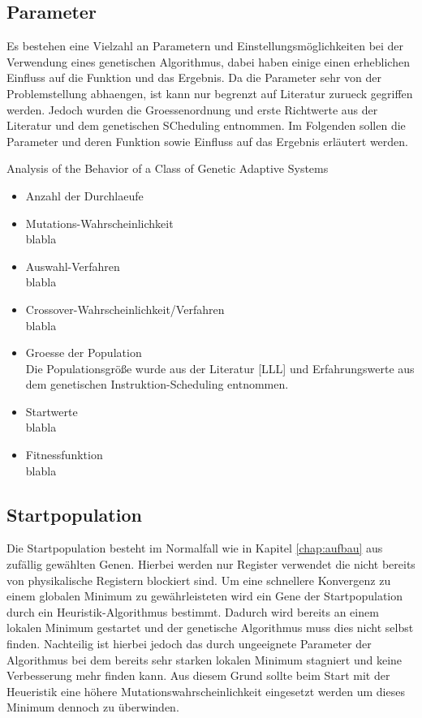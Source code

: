 \subsection{Parameter}
Es bestehen eine Vielzahl an Parametern und Einstellungsmöglichkeiten bei der Verwendung eines genetischen Algorithmus, dabei haben einige einen erheblichen Einfluss auf die Funktion und das Ergebnis. Da die Parameter sehr von der Problemstellung abhaengen, ist kann nur begrenzt auf Literatur zurueck gegriffen werden. Jedoch wurden die Groessenordnung und erste Richtwerte aus der Literatur und dem genetischen SCheduling entnommen. Im Folgenden sollen die Parameter und deren Funktion sowie Einfluss auf das Ergebnis erläutert werden.

Analysis 
of  the 
Behavior 
of 
a  Class 
of 
Genetic 
Adaptive 
Systems

\begin{itemize}
	\item Anzahl der Durchlaeufe\\
	
	\item Mutations-Wahrscheinlichkeit\\
	blabla
	\item Auswahl-Verfahren\\
	blabla
	\item Crossover-Wahrscheinlichkeit/Verfahren\\
	blabla
	\item Groesse der Population\\
	Die Populationsgröße wurde aus der Literatur [LLL] und Erfahrungswerte aus dem genetischen Instruktion-Scheduling entnommen.
	\item Startwerte\\
	blabla
	\item Fitnessfunktion\\
	blabla
\end{itemize}
 
\subsection{Startpopulation}
Die Startpopulation besteht im Normalfall wie in Kapitel \ref{chap:aufbau} aus zufällig gewählten Genen. Hierbei werden nur Register verwendet die nicht bereits von physikalische Registern blockiert sind.
Um eine schnellere Konvergenz zu einem globalen Minimum zu gewährleisteten wird ein Gene der Startpopulation durch ein Heuristik-Algorithmus bestimmt. Dadurch wird bereits an einem lokalen Minimum gestartet und der genetische Algorithmus muss dies nicht selbst finden. 
Nachteilig ist hierbei jedoch das durch ungeeignete Parameter der Algorithmus bei dem bereits sehr starken lokalen Minimum stagniert und keine Verbesserung mehr finden kann. Aus diesem Grund sollte beim Start mit der Heueristik eine höhere Mutationswahrscheinlichkeit eingesetzt werden um dieses Minimum dennoch zu überwinden.

